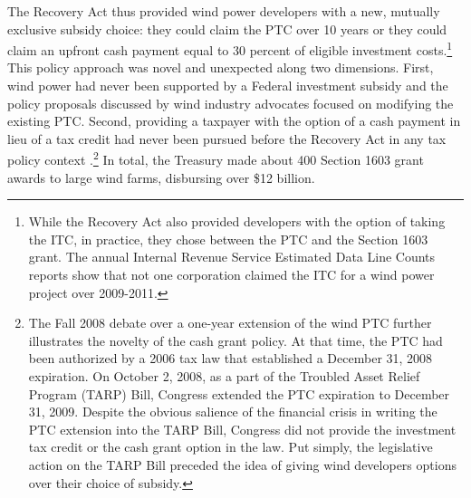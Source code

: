 \documentclass[12pt]{article}
\begin{document}
The Recovery Act thus provided wind power developers with a new, mutually exclusive subsidy choice: they could claim the PTC over 10 years or they could claim an upfront cash payment equal to 30 percent of eligible investment costs.\footnote{While the Recovery Act also provided developers with the option of taking the ITC, in practice, they chose between the PTC and the Section 1603 grant. The annual Internal Revenue Service Estimated Data Line Counts reports show that not one corporation claimed the ITC for a wind power project over 2009-2011.} This policy approach was novel and unexpected along two dimensions. First, wind power had never been supported by a Federal investment subsidy and the policy proposals discussed by wind industry advocates focused on modifying the existing PTC. Second, providing a taxpayer with the option of a cash payment in lieu of a tax credit had never been pursued before the Recovery Act in any tax policy context \citep{john_horowitz_office_of_tax_policy_u.s._treasury_personal_2015}.\footnote{The Fall 2008 debate over a one-year extension of the wind PTC further illustrates the novelty of the cash grant policy. At that time, the PTC had been authorized by a 2006 tax law that established a December 31, 2008 expiration. On October 2, 2008, as a part of the Troubled Asset Relief Program (TARP) Bill, Congress extended the PTC expiration to December 31, 2009. Despite the obvious salience of the financial crisis in writing the PTC extension into the TARP Bill, Congress did not provide the investment tax credit or the cash grant option in the law. Put simply, the legislative action on the TARP Bill preceded the idea of giving wind developers options over their choice of subsidy.} In total, the Treasury made about 400 Section 1603 grant awards to large wind farms, disbursing over \$12 billion.
\end{document}
